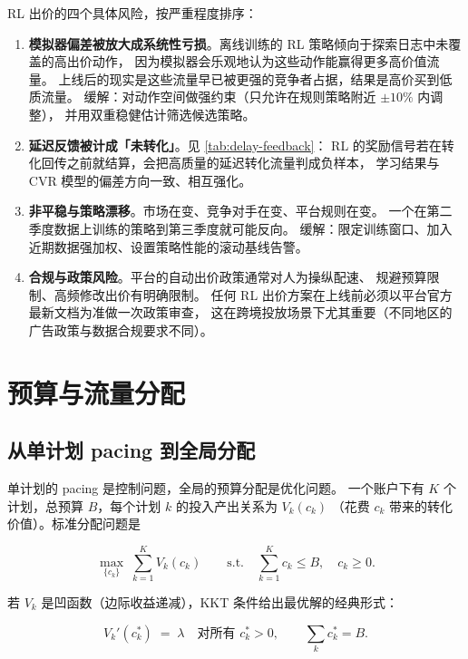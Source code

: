 RL 出价的四个具体风险，按严重程度排序：

\begin{enumerate}
  \item \textbf{模拟器偏差被放大成系统性亏损}。离线训练的 RL 策略倾向于探索日志中未覆盖的高出价动作，
        因为模拟器会乐观地认为这些动作能赢得更多高价值流量。
        上线后的现实是这些流量早已被更强的竞争者占据，结果是高价买到低质流量。
        缓解：对动作空间做强约束（只允许在规则策略附近 $\pm 10\%$ 内调整），
        并用双重稳健估计筛选候选策略。
  \item \textbf{延迟反馈被计成「未转化」}。见 \cref{tab:delay-feedback}：
        RL 的奖励信号若在转化回传之前就结算，会把高质量的延迟转化流量判成负样本，
        学习结果与 CVR 模型的偏差方向一致、相互强化。
  \item \textbf{非平稳与策略漂移}。市场在变、竞争对手在变、平台规则在变。
        一个在第二季度数据上训练的策略到第三季度就可能反向。
        缓解：限定训练窗口、加入近期数据强加权、设置策略性能的滚动基线告警。
  \item \textbf{合规与政策风险}。平台的自动出价政策通常对人为操纵配速、
        规避预算限制、高频修改出价有明确限制。
        任何 RL 出价方案在上线前必须以平台官方最新文档为准做一次政策审查，
        这在跨境投放场景下尤其重要（不同地区的广告政策与数据合规要求不同）。
\end{enumerate}

\section{预算与流量分配}

\subsection{从单计划 pacing 到全局分配}

单计划的 pacing 是控制问题，全局的预算分配是优化问题。
一个账户下有 $K$ 个计划，总预算 $B$，每个计划 $k$ 的投入产出关系为 $V_k(c_k)$
（花费 $c_k$ 带来的转化价值）。标准分配问题是

\begin{equation}
\max_{\{c_k\}} \; \sum_{k=1}^{K} V_k(c_k)
\qquad \text{s.t.} \quad \sum_{k=1}^{K} c_k \le B, \quad c_k \ge 0 .
\label{eq:budget-alloc}
\end{equation}

若 $V_k$ 是凹函数（边际收益递减），KKT 条件给出最优解的经典形式：

\begin{equation}
V_k'(c_k^{*}) \;=\; \lambda \quad \text{对所有 } c_k^{*} > 0, \qquad
\sum_k c_k^{*} = B .
\label{eq:kkt-alloc}
\end{equation}

